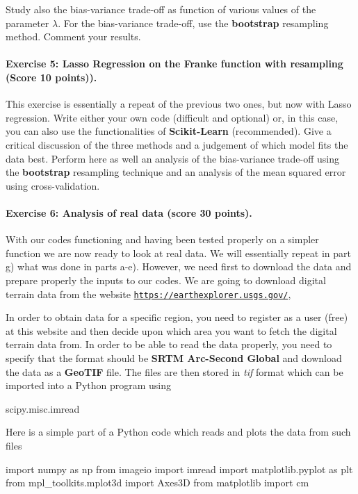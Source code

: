 \documentclass[%
oneside,                 %
final,                   %
10pt]{article}
\begin{document}
Study also the bias-variance trade-off as function of various values of
the parameter $\lambda$. For the bias-variance trade-off, use the \textbf{bootstrap} resampling method. Comment your results. 

\paragraph{Exercise 5: Lasso Regression on the Franke function  with resampling (Score 10 points)).}
This exercise is essentially a repeat of the previous two ones, but now
with Lasso regression. Write either your own code (difficult and optional) or, in this case,
you can also use the functionalities of \textbf{Scikit-Learn} (recommended). 
Give a
critical discussion of the three methods and a judgement of which
model fits the data best.  Perform here as well an analysis of the bias-variance trade-off using the \textbf{bootstrap} resampling technique and an analysis of the mean squared error using cross-validation. 

\paragraph{Exercise 6: Analysis of real data  (score 30 points).}
With our codes functioning and having been tested properly on a
simpler function we are now ready to look at real data. We will
essentially repeat in part g) what was done in parts a-e). However, we
need first to download the data and prepare properly the inputs to our
codes.  We are going to download digital terrain data from the website
\href{{https://earthexplorer.usgs.gov/}}{\nolinkurl{https://earthexplorer.usgs.gov/}},

In order to obtain data for a specific region, you need to register as
a user (free) at this website and then decide upon which area you want
to fetch the digital terrain data from.  In order to be able to read
the data properly, you need to specify that the format should be \textbf{SRTM
Arc-Second Global} and download the data as a \textbf{GeoTIF} file.  The
files are then stored in \emph{tif} format which can be imported into a
Python program using

\bpycod
scipy.misc.imread
\epycod

Here is a simple part of a Python code which reads and plots the data
from such files

\bpycod
import numpy as np
from imageio import imread
import matplotlib.pyplot as plt
from mpl_toolkits.mplot3d import Axes3D
from matplotlib import cm
\end{document}
